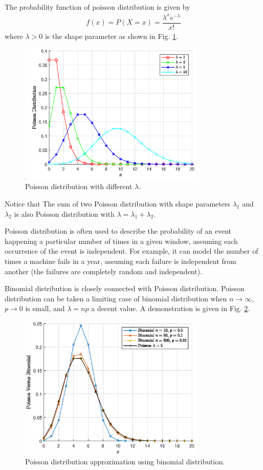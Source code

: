 The probability function of poisson distribution is given by
\begin{eqnarray}
  f(x) = P(X=x) = \dfrac{\lambda^xe^{-\lambda}}{x!} \nonumber
\end{eqnarray}
where $\lambda >0$ is the shape parameter as shown in Fig. \ref{fig:poisson_pmf}.
\begin{figure}
	\centering
	\includegraphics[width=250pt]{chapters/ch-commonly-seen-distributions/figs/poisson_pmf.eps}
	\caption{Poisson distribution with different $\lambda$.} \label{fig:poisson_pmf}
\end{figure}

Notice that The sum of two Poisson distribution with shape parameters $\lambda_1$ and $\lambda_2$ is also Poisson distribution with $\lambda = \lambda_1 + \lambda_2$.

Poisson distribution is often used to describe the probability of an event happening a particular number of times in a given window, assuming each occurrence of the event is independent. For example, it can model the number of times a machine fails in a year, assuming each failure is independent from another (the failures are completely random and independent). 

Binomial distribution is closely connected with Poisson distribution. Poisson distribution can be taken a limiting case of binomial distribution when $n\rightarrow\infty$, $p\rightarrow 0$ is small, and $\lambda = np$ a decent value. A demonstration is given in Fig. \ref{fig:poisson_vs_b}.
\begin{figure}
	\centering
	\includegraphics[width=250pt]{chapters/ch-commonly-seen-distributions/figs/poisson_vs_b.eps}
	\caption{Poisson distribution approximation using binomial distribution.} \label{fig:poisson_vs_b}
\end{figure}

